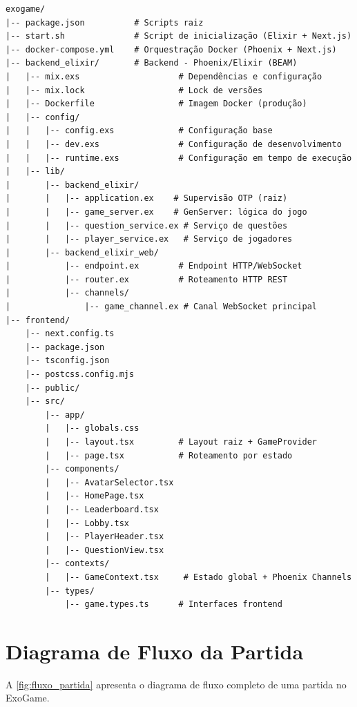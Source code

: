 \documentclass[
	12pt,
	openany,
	oneside,
	a4paper,
	english,
	brazil
]{abntex2}
\begin{document}
\begin{apendicesenv}
\begin{lstlisting}[language={}, caption={Estrutura de diretórios do projeto ExoGame}, label={lst:diretorios}]
exogame/
|-- package.json          # Scripts raiz
|-- start.sh              # Script de inicialização (Elixir + Next.js)
|-- docker-compose.yml    # Orquestração Docker (Phoenix + Next.js)
|-- backend_elixir/       # Backend - Phoenix/Elixir (BEAM)
|   |-- mix.exs                    # Dependências e configuração
|   |-- mix.lock                   # Lock de versões
|   |-- Dockerfile                 # Imagem Docker (produção)
|   |-- config/
|   |   |-- config.exs             # Configuração base
|   |   |-- dev.exs                # Configuração de desenvolvimento
|   |   |-- runtime.exs            # Configuração em tempo de execução
|   |-- lib/
|       |-- backend_elixir/
|       |   |-- application.ex    # Supervisão OTP (raiz)
|       |   |-- game_server.ex    # GenServer: lógica do jogo
|       |   |-- question_service.ex # Serviço de questões
|       |   |-- player_service.ex   # Serviço de jogadores
|       |-- backend_elixir_web/
|           |-- endpoint.ex        # Endpoint HTTP/WebSocket
|           |-- router.ex          # Roteamento HTTP REST
|           |-- channels/
|               |-- game_channel.ex # Canal WebSocket principal
|-- frontend/
    |-- next.config.ts
    |-- package.json
    |-- tsconfig.json
    |-- postcss.config.mjs
    |-- public/
    |-- src/
        |-- app/
        |   |-- globals.css
        |   |-- layout.tsx         # Layout raiz + GameProvider
        |   |-- page.tsx           # Roteamento por estado
        |-- components/
        |   |-- AvatarSelector.tsx
        |   |-- HomePage.tsx
        |   |-- Leaderboard.tsx
        |   |-- Lobby.tsx
        |   |-- PlayerHeader.tsx
        |   |-- QuestionView.tsx
        |-- contexts/
        |   |-- GameContext.tsx     # Estado global + Phoenix Channels
        |-- types/
            |-- game.types.ts      # Interfaces frontend
\end{lstlisting}

\chapter{Diagrama de Fluxo da Partida}\label{ap:fluxo}

A \autoref{fig:fluxo_partida} apresenta o diagrama de fluxo completo de uma partida no ExoGame.


\end{apendicesenv}
\end{document}
